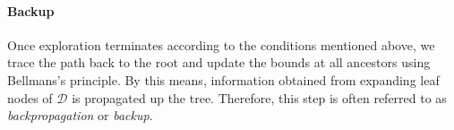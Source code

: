 \paragraph{Backup}

Once exploration terminates according to the conditions mentioned above, we
trace the path back to the root and update the bounds at all ancestors using
Bellmans's principle. By this means, information obtained from expanding leaf
nodes of $\mathcal{D}$ is propagated up the tree. Therefore, this step is often
referred to as \emph{backpropagation} or \emph{backup}.

% 
% 

